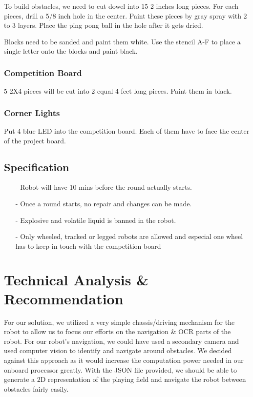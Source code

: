 \documentclass[12pt]{article}
\begin{document}
To build obstacles, we need to cut dowel into 15 2 inches long pieces. For each pieces, drill a 5/8 inch hole in the center. Paint these pieces by gray spray with 2 to 3 layers. Place the ping pong ball in the hole after it gets dried.

Blocks need to be sanded and paint them white. Use the stencil A-F to place a single letter onto the blocks and paint black.

\subsubsection{Competition Board}

5 2X4 pieces will be cut into 2 equal 4 feet long pieces. Paint them in black.

\subsubsection{Corner Lights}

Put 4 blue LED into the competition board. Each of them have to face the center of the project board.

\subsection{Specification}

\begin{itemize}[noitemsep]
	\item[-] Robot will have 10 mins before the round actually starts.
	\item[-] Once a round starts, no repair and changes can be made. 
	\item[-] Explosive and volatile liquid is banned in the robot.
	\item[-] Only wheeled, tracked or legged robots are allowed and especial one wheel has to keep in touch with the competition board
\end{itemize}

\section{Technical Analysis \& Recommendation}

For our solution, we utilized a very simple chassis/driving mechanism for the robot to allow us to focus our efforts on the navigation \& OCR parts of the robot. For our robot’s navigation, we could have used a secondary camera and used computer vision to identify and navigate around obstacles. We decided against this approach as it would increase the computation power needed in our onboard processor greatly. With the JSON file provided, we should be able to generate a 2D representation of the playing field and navigate the robot between obstacles fairly easily. 
\end{document}
